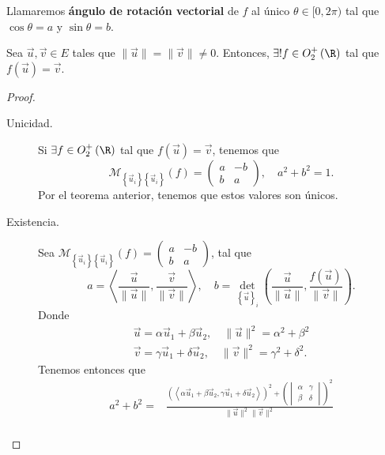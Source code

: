 \begin{fdefinition}[]
\normalfont Llamaremos \textbf{ángulo de rotación vectorial} de $\displaystyle f $ al único $\displaystyle \theta \in [0,2\pi) $ tal que $\displaystyle \cos\theta = a $ y $\displaystyle \sin\theta = b $.
\end{fdefinition}
\begin{ftheorem}[]
\normalfont Sea $\displaystyle \vec{u}, \vec{v} \in E $ tales que $\displaystyle \|\vec{u}\| = \|\vec{v}\| \neq 0 $. Entonces, $\displaystyle \exists ! f \in O^{+}_{2}\left(\R\right)$ tal que $\displaystyle f\left(\vec{u}\right) = \vec{v} $.
\end{ftheorem}
\begin{proof}
\begin{description}
\item[Unicidad.] Si $\displaystyle \exists f \in O^{+}_{2}\left(\R\right) $ tal que $\displaystyle f\left(\vec{u}\right) = \vec{v} $, tenemos que
	\[ \mathcal{M}_{ \left\{ \vec{u}_{i}\right\} \left\{ \vec{u}_{i}\right\} }\left(f\right) = \begin{pmatrix} a & - b \\ b & a \end{pmatrix}, \quad a^{2} + b^{2} = 1 .\]
	Por el teorema anterior, tenemos que estos valores son únicos.
\item[Existencia.] Sea $\displaystyle \mathcal{M}_{ \left\{ \vec{u}_{i}\right\} \left\{ \vec{u}_{i}\right\} }\left(f\right) = \begin{pmatrix} a & - b \\ b & a \end{pmatrix} $, tal que 
	\[ a = \left\langle \frac{\vec{u}}{\|\vec{u}\|}, \frac{\vec{v}}{\|\vec{v}\|} \right\rangle , \quad b = \det_{ \left\{ \vec{u}\right\} _{i}}\left(\frac{\vec{u}}{\|\vec{u}\|},\frac{f\left(\vec{u}\right)}{\|\vec{v}\|}\right) .\]
	Donde 
\[
\begin{split}
	\vec{u} = \alpha\vec{u}_{1} + \beta\vec{u}_{2}, \quad \|\vec{u}\|^{2} = \alpha^{2} + \beta^{2} \\
	\vec{v} = \gamma \vec{u}_{1} + \delta \vec{u}_{2}, \quad \|\vec{v}\|^{2} = \gamma^{2} + \delta^{2}.
\end{split}
\]
Tenemos entonces que
\[
\begin{split}
	a^{2} + b^{2} = & \frac{\left(\left\langle \alpha\vec{u}_{1}+\beta\vec{u}_{2}, \gamma\vec{u}_{1} + \delta \vec{u}_{2} \right\rangle \right)^{2} + \left(\begin{vmatrix} \alpha & \gamma \\ \beta & \delta  \end{vmatrix} \right)^{2}}{\|\vec{u}\|^{2}\|\vec{v}\|^{2}} \\

\end{split}\]
\end{description}
\end{proof}
